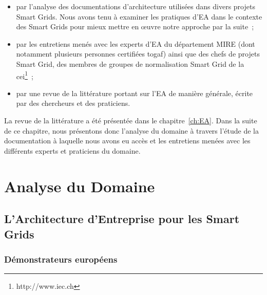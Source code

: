     \begin{itemize}

        \item par l'analyse des documentations d'architecture utilisées dans divers projets Smart
    Grids. Nous avons tenu à examiner les pratiques d'EA dans le contexte des Smart Grids
    pour mieux mettre en œuvre notre approche par la suite~;

        \item par les entretiens menés avec les experts d'EA du département MIRE (dont notamment
    plusieurs personnes certifiées \gls{togaf}) ainsi que des chefs de projets Smart Grid,
    des membres de groupes de normalisation Smart Grid de la \gls{cei}\footnote{http://www.iec.ch}~;

        \item par une revue de la littérature portant sur l'EA de manière générale,
        écrite par des chercheurs et des praticiens.
        
    \end{itemize}

La revue de la littérature a été présentée dans le chapitre~\ref{ch:EA}.
Dans la suite de ce chapitre, nous présentons donc l'analyse du domaine à travers l'étude
de la documentation à laquelle nous avons eu accès et les entretiens menées avec les différents
experts et praticiens du domaine.












\section{Analyse du Domaine}

    \subsection{L'Architecture d'Entreprise pour les Smart Grids}
    \subsubsection{Démonstrateurs européens}
    \label{sec:DemonstrateursSG}

